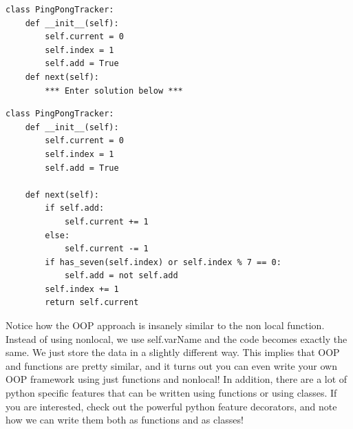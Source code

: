 \documentclass{exam}
\begin{document}
\begin{questions}
\begin{blocksection}
\begin{lstlisting}
class PingPongTracker:
    def __init__(self):
        self.current = 0
        self.index = 1
        self.add = True
    def next(self):
        *** Enter solution below ***
\end{lstlisting}
\end{blocksection}

\begin{blocksection}
\begin{solution}[0.3in]
\begin{lstlisting}
class PingPongTracker:
    def __init__(self):
        self.current = 0
        self.index = 1
        self.add = True
    
    def next(self):
        if self.add:
            self.current += 1
        else:
            self.current -= 1
        if has_seven(self.index) or self.index % 7 == 0:
            self.add = not self.add
        self.index += 1
        return self.current
\end{lstlisting}
Notice how the OOP approach is insanely similar to the non local function. Instead of using nonlocal, we use self.varName and the code becomes exactly the same. We just store the data in a slightly different way. This implies that OOP and functions are pretty similar, and it turns out you can even write your own OOP framework using just functions and nonlocal!  \newline
\newline
In addition, there are a lot of python specific features that can be written using functions or using classes. If you are interested, check out the powerful python feature decorators, and note how we can write them both as functions and as classes!
\end{solution}

\end{blocksection}

\end{questions}

\end{document}
